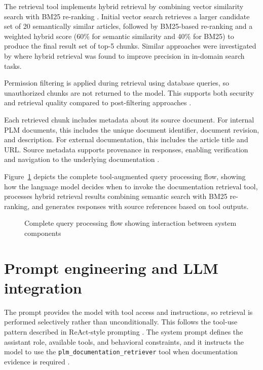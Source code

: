 The retrieval tool implements hybrid retrieval by combining vector similarity search with BM25 re-ranking \parencite{robertsonProbabilisticRelevanceFramework2009}. Initial vector search retrieves a larger candidate set of 20 semantically similar articles, followed by BM25-based re-ranking and a weighted hybrid score (60\% for semantic similarity and 40\% for BM25) to produce the final result set of top-5 chunks. Similar approaches were investigated by \textcite{bruchAnalysisFusionFunctions2024} where hybrid retrieval was found to improve precision in in-domain search tasks.

\label{subsec:permission-filtering}
Permission filtering is applied during retrieval using database queries, so unauthorized chunks are not returned to the model. This supports both security and retrieval quality compared to post-filtering approaches \parencite{zhongHoneyBeeEfficientRolebased2025, jeongPermissionAwareRAGIdentity2025}.

\label{subsec:source-tracking}
Each retrieved chunk includes metadata about its source document. For internal PLM documents, this includes the unique document identifier, document revision, and description. For external documentation, this includes the article title and URL. Source metadata supports provenance in responses, enabling verification and navigation to the underlying documentation \parencite{NEURIPS2020_6b493230}.

Figure~\ref{fig:query-flow} depicts the complete tool-augmented query processing flow, showing how the language model decides when to invoke the documentation retrieval tool, processes hybrid retrieval results combining semantic search with BM25 re-ranking, and generates responses with source references based on tool outputs.

\begin{figure}[htbp]
    \centering
    \small{\resizebox{\textwidth}{!}{}}
    \caption{Complete query processing flow showing interaction between system components}
    \label{fig:query-flow}
\end{figure}

\section{Prompt engineering and LLM integration}
\label{sec:prompt-engineering}

The prompt provides the model with tool access and instructions, so retrieval is performed selectively rather than unconditionally. This follows the tool-use pattern described in ReAct-style prompting \parencite{yaoReActSynergizingReasoning2022}. The system prompt defines the assistant role, available tools, and behavioral constraints, and it instructs the model to use the \texttt{plm\_documentation\_retriever} tool when documentation evidence is required \parencite{yaoReActSynergizingReasoning2022, NEURIPS2020_6b493230}.

